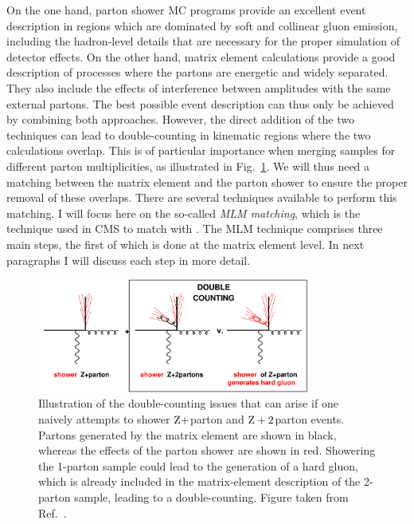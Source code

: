 On the one hand, parton shower MC programs provide an excellent event description in regions which
are dominated by soft and collinear gluon emission, including the hadron-level details that are
necessary for the proper simulation of detector effects. 
On the other hand, matrix element calculations provide a good description of processes where
the partons are energetic and widely separated. They also include the effects of
interference between amplitudes with the same external partons. 
The best possible event description can thus only be achieved by combining both approaches.
However, the direct addition of the two techniques can lead to double-counting in kinematic regions
where the two calculations overlap. This is of particular importance when merging samples for
different parton multiplicities, as illustrated in Fig.~\ref{fig:overlap}.
We will thus need a matching between the matrix element
and the parton shower to ensure the proper removal of these overlaps.
There are several techniques available to perform this matching. I will focus here on the so-called
\textit{MLM matching}, which is the technique used in CMS to match \MADGRAPH with
\PYTHIA. The MLM technique comprises three main steps, the first of which is done at the
matrix element level. In next paragraphs I will discuss each step in more detail. 


\begin{figure}[t]
  \centering
  \includegraphics[width=0.8\textwidth]{figures/eventreco_generation/overlap}
  \caption{ Illustration of the double-counting issues that can arise if one naively attempts to
shower $\mathrm{Z}+$parton and $\mathrm{Z}+2$parton events. Partons generated by the matrix element are
shown in black, whereas the effects of the parton shower are shown in red. Showering the 1-parton
sample could lead to the generation of a hard gluon, which is already included in the matrix-element
description of the 2-parton sample, leading to a double-counting. Figure taken from
Ref.~\cite{Salam:2010zt}. 
  \label{fig:overlap}}
\end{figure}


